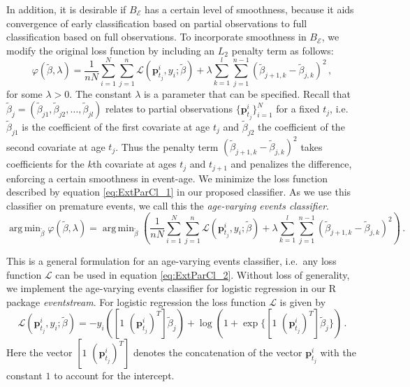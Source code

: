 \documentclass[a4paper,11pt]{article}
\DeclareMathOperator*{\argmin}{arg\,min}
\begin{document}
In addition, it is desirable if $B_{\mathscr{E}}$ has a certain level of smoothness, because it aids convergence of early classification based on partial observations to  full classification based on full observations. To incorporate smoothness in $B_{\mathscr{E}}$, we modify the original loss function by including an $L_2$ penalty term as follows:
\begin{equation}\label{eq:ExtParCl_1}
	\varphi\left(\tilde{\beta}, \lambda \right) = \frac{1}{nN} \sum_{i=1}^N \sum_{j=1}^n \mathscr{L} \left( \bm{p}^i_{t_j},y_i;\tilde{\beta} \right) + \lambda \sum_{k=1}^l\sum_{j=1}^{n-1} \left(\tilde{\beta}_{j+1,k} - \tilde{\beta}_{j,k} \right)^2 \, ,
\end{equation}
for some $\lambda >0 $. The constant $\lambda$ is a parameter that can be specified. Recall that $\tilde{\beta}_j = \left( \tilde{\beta}_{j1}, \tilde{\beta}_{j2}, \dots, \tilde{\beta}_{jl} \right)$ relates to partial observations $\{ \bm{p}^i_{t_j}\}_{i=1}^N$ for a fixed $t_j$, i.e.\ $\tilde{\beta}_{j1}$ is the coefficient of the first covariate at age $t_j$ and $\tilde{\beta}_{j2}$ the coefficient of the second covariate at age $t_j$. Thus the penalty term $(\tilde{\beta}_{j+1,k} - \tilde{\beta}_{j,k})^2$ takes coefficients for the $k$th covariate at ages $t_j$ and $t_{j+1}$ and penalizes the difference, enforcing a certain smoothness in event-age. We minimize the loss function described by equation \eqref{eq:ExtParCl_1} in our proposed classifier. As we use this classifier on premature events, we call this the \textit{age-varying events classifier}.
\begin{equation}\label{eq:ExtParCl_2}
	\argmin_{\tilde{\beta}} \varphi\left(\tilde{\beta}, \lambda \right) = 	\argmin_{\tilde{\beta}} \left( \frac{1}{nN} \sum_{i=1}^N \sum_{j=1}^n \mathscr{L} ( \bm{p}^i_{t_j},y_i;\tilde{\beta} ) + \lambda \sum_{k=1}^l\sum_{j=1}^{n-1} (\tilde{\beta}_{j+1,k} - \tilde{\beta}_{j,k} )^2 \right) \, .
\end{equation}

This is a general formulation for an age-varying events classifier, i.e.\ any loss function $\mathscr{L}$ can be used in equation \eqref{eq:ExtParCl_2}. Without loss of generality, we implement the age-varying events classifier for logistic regression in our R package \textit{eventstream}. For logistic regression \citep{friedman2001elements} the loss function $\mathscr{L}$ is given by
\begin{equation}\label{eq:LogReg}
	\mathscr{L} (\bm{p}^i_{t_j},y_i;\tilde{\beta}) = - y_i \left( [ 1 \,\, ( \bm{p}^i_{t_j})^T] \tilde{\beta}_{j} \right) + \log \left( 1+ \exp\big\{[ 1 \, \,( \bm{p}^i_{t_j})^T ] \tilde{\beta}_{j}\big\} \right) \, .
\end{equation}
Here the vector $[1 \,\, ( \bm{p}^i_{t_j})^T]$ denotes the concatenation of the vector $\bm{p}^i_{t_j}$ with the constant $1$ to account for the intercept. %
\end{document}
